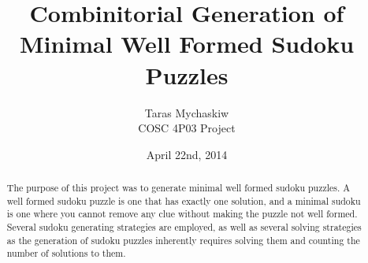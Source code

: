 \documentclass[12pt]{article}
\title{Combinitorial Generation of Minimal Well Formed Sudoku Puzzles}
\author{Taras Mychaskiw\\COSC 4P03 Project}
\date{April 22nd, 2014}
\begin{document}
\maketitle
    \begin{abstract}
    The purpose of this project was to generate minimal well formed sudoku puzzles. A well formed sudoku puzzle is one that has
    exactly one solution, and a minimal sudoku is one where you cannot remove any clue without making the puzzle not well formed.
    Several sudoku generating strategies are employed, as well as several solving strategies as the generation of sudoku puzzles
    inherently requires solving them and counting the number of solutions to them.
    \end{abstract}

    \thispagestyle{empty}
    \tableofcontents
    \thispagestyle{empty}
    \mbox{}
    \clearpage
    \setcounter{page}{1}
    
    
    
    
    
    
    
    
    
    
\end{document}
